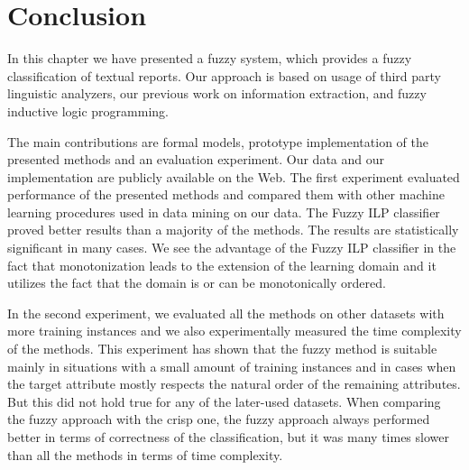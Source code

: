 



\section{Conclusion} \label{sec:conclusion}
In this chapter we have presented a fuzzy system, which provides a fuzzy classification of textual reports. Our approach is based on usage of third party linguistic analyzers, our previous work on information extraction, and fuzzy inductive logic programming.

The main contributions are formal models, prototype implementation of the presented methods and an evaluation experiment. Our data and our implementation are publicly available on the Web. The first experiment evaluated performance of the presented methods and compared them with other machine learning procedures used in data mining on our data. The Fuzzy ILP classifier proved better results than a majority of the methods. The results are statistically significant in many cases. 
We see the advantage of the Fuzzy ILP classifier in the fact that monotonization leads to the extension of the learning domain and it utilizes the fact that the domain is or can be monotonically ordered.

In the second experiment, we evaluated all the methods on other datasets with more training instances and we also experimentally measured the time complexity of the methods. This experiment has shown that the fuzzy method is suitable mainly in situations with a small amount of training instances and in cases when the target attribute mostly respects the natural order of the remaining attributes. But this did not hold true for any of the later-used datasets. When comparing the fuzzy approach with the crisp one, the fuzzy approach always performed better in terms of correctness of the classification, but it was many times slower than all the methods in terms of time complexity.
